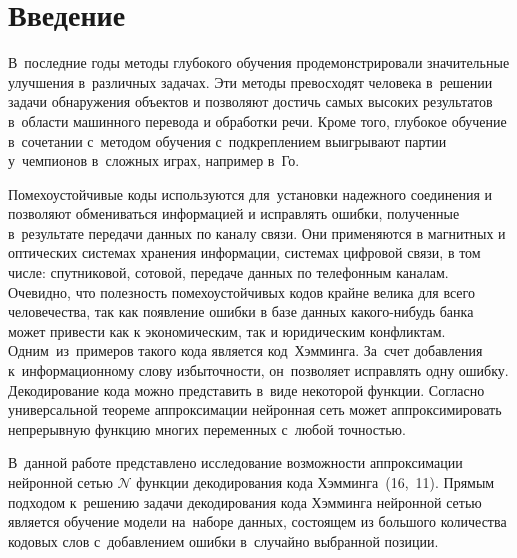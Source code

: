 \section{Введение}

В~последние годы методы глубокого обучения продемонстрировали значительные улучшения в~различных задачах\cite{bib:buhrstein}. Эти методы превосходят человека в~решении задачи обнаружения объектов и позволяют достичь самых высоких результатов в~области машинного перевода и обработки речи. Кроме того, глубокое обучение в~сочетании с~методом обучения с~подкреплением выигрывают партии у~чемпионов в~сложных играх, например в~Го\cite[c.\,484–489]{bib:win_go}.

Помехоустойчивые коды\cite[с.\,4]{bib:codes} используются для~установки надежного соединения и позволяют обмениваться информацией и исправлять ошибки, полученные в~результате передачи данных по каналу связи. Они применяются в магнитных и оптических системах хранения информации, системах цифровой связи, в том числе: спутниковой, сотовой, передаче данных по телефонным каналам. Очевидно, что полезность помехоустойчивых кодов крайне велика для всего человечества, так как появление ошибки в базе данных какого-нибудь банка может привести как к экономическим, так и юридическим конфликтам. Одним~из~примеров такого кода является код~Хэмминга\cite[с.\,49]{bib:codes2}. За~счет добавления к~информационному слову избыточности, он~позволяет исправлять одну ошибку. Декодирование\cite[c.\,5]{bib:codes} кода можно представить в~виде некоторой функции. Согласно универсальной теореме аппроксимации\cite{bib:approximation_theorem} нейронная сеть\cite[с.\,23]{bib:neural_networks} может аппроксимировать непрерывную функцию многих переменных с~любой точностью.

В~данной работе представлено исследование возможности аппроксимации нейронной сетью $\mathcal{N}$ функции декодирования кода Хэмминга~(16,~11). Прямым подходом к~решению задачи декодирования кода Хэмминга нейронной сетью является обучение модели на~наборе данных, состоящем из большого количества кодовых слов с~добавлением ошибки в~случайно выбранной позиции.


\newpage 